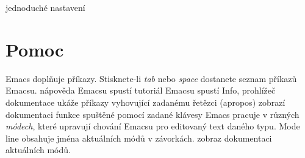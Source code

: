  jednoduché nastavení

\section{Pomoc}

Emacs doplňuje příkazy. Stisknete-li  {\it tab\/} nebo {\it
space\/} dostanete seznam příkazů Emacsu.
\askip
{} nápověda Emacsu
 spustí tutoriál Emacsu
 spustí Info, prohlížeč dokumentace
 ukáže příkazy vyhovující zadanému řetězci (apropos)
 zobrazí dokumentaci funkce spuštěné pomocí zadané klávesy
\askip
Emacs pracuje v různých {\it módech}, které upravují chování
Emacsu pro editovaný text daného typu. Mode line obsahuje jména aktuálních
módů v závorkách.
\askip
{} zobraz dokumentaci aktuálních módů.

\copyrightnotice

\bye

